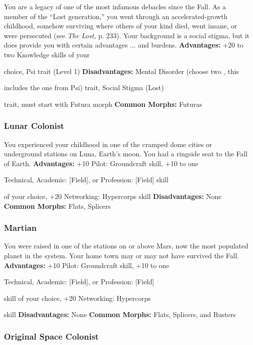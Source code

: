 You are a legacy of one of the most infamous debacles 
since the Fall. As a member of the ``Lost generation,'' 
you went through an accelerated-growth childhood, 
somehow surviving where others of your kind died, 
went insane, or were persecuted (see \textit{The Lost,} p. 233). 
Your background is a social stigma, but it does provide 
you with certain advantages ... and burdens.
\textbf{Advantages:  }+20 to two Knowledge skills of your 

choice, Psi trait (Level 1)
\textbf{Disadvantages:} Mental Disorder (choose two , this 

includes the one from Psi) trait, Social Stigma (Lost) 

trait, must start with Futura morph
\textbf{Common Morphs:} Futuras

\subsubsection{Lunar Colonist}

You experienced your childhood in one of the cramped 
dome cities or underground stations on Luna, Earth's 
moon. You had a ringside seat to the Fall of Earth.
\textbf{Advantages:} +10 Pilot: Groundcraft skill, +10 to one 

Technical, Academic: [Field], or Profession: [Field] skill 

of your choice, +20 Networking: Hypercorps skill
\textbf{Disadvantages:} None
\textbf{Common Morphs:} Flats, Splicers

\subsubsection{Martian}


You were raised in one of the stations on or above 
Mars, now the most populated planet in the system. 
Your home town may or may not have survived the Fall.
\textbf{Advantages:} +10 Pilot: Groundcraft skill, +10 to one 

Technical, Academic: [Field], or Profession: [Field] 

skill of your choice, +20 Networking: Hypercorps 

skill
\textbf{Disadvantages:} None
\textbf{Common Morphs:} Flats, Splicers, and Rusters

\subsubsection{Original Space Colonist}


